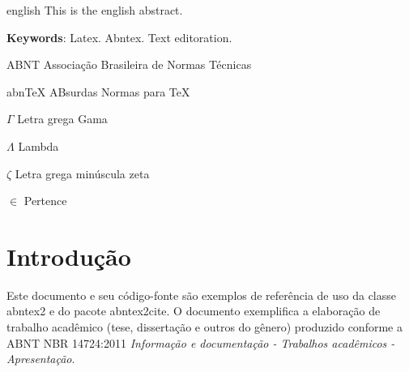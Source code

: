 \documentclass[
	12pt,				%
	openright,			%
	twoside,			%
	a4paper,			%
	chapter=TITLE,		%
	english,			%
	brazil				%
	]{abntex2}
\begin{document}
\begin{resumo}[Abstract]
 \begin{otherlanguage*}{english}
   This is the english abstract.
   \noindent
   
   \textbf{Keywords}: Latex. Abntex. Text editoration.
 \end{otherlanguage*}
\end{resumo}


\listoffigures*
\cleardoublepage

\listoftables*
\cleardoublepage

\begin{siglas}
  \item[ABNT] Associação Brasileira de Normas Técnicas
  \item[abnTeX] ABsurdas Normas para TeX
\end{siglas}

\begin{simbolos}
  \item[$ \Gamma $] Letra grega Gama
  \item[$ \Lambda $] Lambda
  \item[$ \zeta $] Letra grega minúscula zeta
  \item[$ \in $] Pertence
\end{simbolos}

\tableofcontents*
\cleardoublepage



\textual
\pagestyle{simple}
\chapter{Introdução}


Este documento e seu código-fonte são exemplos de referência de uso da classe
\textsf{abntex2} e do pacote \textsf{abntex2cite}. O documento 
exemplifica a elaboração de trabalho acadêmico (tese, dissertação e outros do
gênero) produzido conforme a ABNT NBR 14724:2011 \emph{Informação e documentação
- Trabalhos acadêmicos - Apresentação}.
\end{document}
